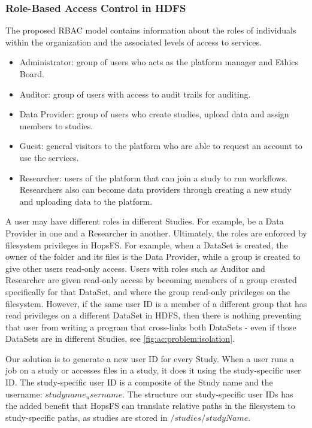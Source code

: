 \subsubsection {Role-Based Access Control in HDFS}
The proposed RBAC model contains information about the roles of individuals within the organization and the associated levels of access to services.
\begin{itemize}
\item Administrator: group of users who acts as the platform manager and Ethics Board.
\item Auditor: group of users with access to audit trails for auditing.
\item Data Provider: group of users who create studies, upload data and assign members to studies.
\item Guest: general visitors to the platform who are able to request an account to use the services.
\item Researcher: users of the platform that can join a study to run workflows. Researchers also can become data providers through creating a new study and uploading data to the platform.
\end{itemize}
A user may have different roles in different Studies. For example, be a Data Provider in one and a Researcher in another. Ultimately, the roles are enforced by filesystem privileges in HopsFS. For example, when a DataSet is created, the owner of the folder and its files is the Data Provider, while a group is created to give other users read-only access. Users with roles such as Auditor and Researcher are given read-only access by becoming members of a group created specifically for that DataSet, and where the group read-only privileges on the filesystem. However, if the same user ID is a member of a different group that has read privileges on a different DataSet in HDFS, then there is nothing preventing that user from writing a program that cross-links both DataSets - even if those DataSets are in different Studies, see \ref{fig:ac:problem:isolation}.

Our solution is to generate a new user ID for every Study. When a user runs a job on a study or accesses files in a study, it does it using the study-specific user ID. The study-specific user ID is a composite of the Study name and the username: $studyname_username$. The structure our study-specific user IDs has the added benefit that HopsFS can translate relative paths in the filesystem to study-specific paths, as studies are stored in $/studies/studyName$.

